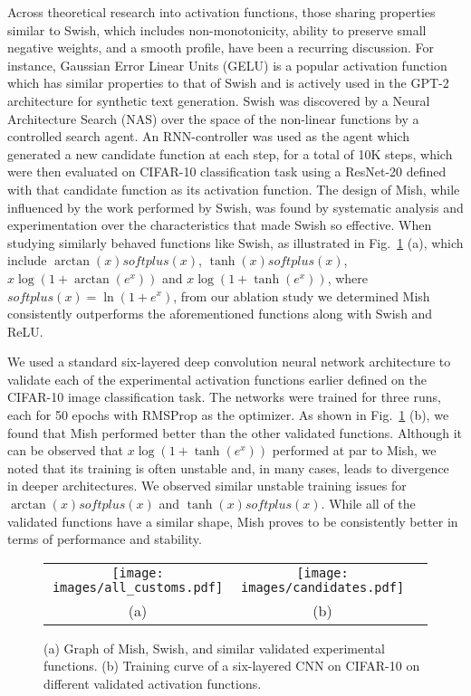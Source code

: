 \documentclass{bmvc2k}
\begin{document}
Across theoretical research into activation functions, those sharing properties similar to Swish, which includes non-monotonicity, ability to preserve small negative weights, and a smooth profile, have been a recurring discussion. For instance, Gaussian Error Linear Units (GELU) \cite{hendrycks2016gaussian} is a popular activation function which has similar properties to that of Swish and is actively used in the GPT-2 architecture \cite{radford2019language} for synthetic text generation. Swish was discovered by a Neural Architecture Search (NAS) \cite{zoph2016neural} over the space of the non-linear functions by a controlled search agent. An RNN-controller was used as the agent which generated a new candidate function at each step, for a total of 10K steps, which were then evaluated on CIFAR-10 classification task using a ResNet-20 defined with that candidate function as its activation function. The design of Mish, while influenced by the work performed by Swish, was found by systematic analysis and experimentation over the characteristics that made Swish so effective. When studying similarly behaved functions like Swish, as illustrated in Fig.~\ref{fig:candidates} (a), which include $\arctan(x)softplus(x)$, $\tanh(x)softplus(x)$, $x\log(1+\arctan({e}^{x}))$ and $x\log(1+\tanh({e}^{x}))$, where $softplus(x) = \ln(1+{e}^{x})$, from our ablation study we determined Mish consistently outperforms the aforementioned functions along with Swish and ReLU.

We used a standard six-layered deep convolution neural network architecture to validate each of the experimental activation functions earlier defined on the CIFAR-10 image classification task. The networks were trained for three runs, each for 50 epochs with RMSProp as the optimizer. As shown in Fig.~\ref{fig:candidates} (b), we found that Mish performed better than the other validated functions. Although it can be observed that $x\log(1+\tanh({e}^{x}))$ performed at par to Mish, we noted that its training is often unstable and, in many cases, leads to divergence in deeper architectures. We observed similar unstable training issues for $\arctan(x)softplus(x)$ and $\tanh(x)softplus(x)$. While all of the validated functions have a similar shape, Mish proves to be consistently better in terms of performance and stability. 

\begin{figure}
	\centering
	\begin{tabular}{ccc}
		\texttt{[image: images/all\_customs.pdf]}&
		\texttt{[image: images/candidates.pdf]}\\
		(a)&(b)
	\end{tabular}
	\caption{(a) Graph of Mish, Swish, and similar validated experimental functions. (b) Training curve of a six-layered CNN on CIFAR-10 on different validated activation functions.}
	\label{fig:candidates}
\end{figure}
\end{document}
